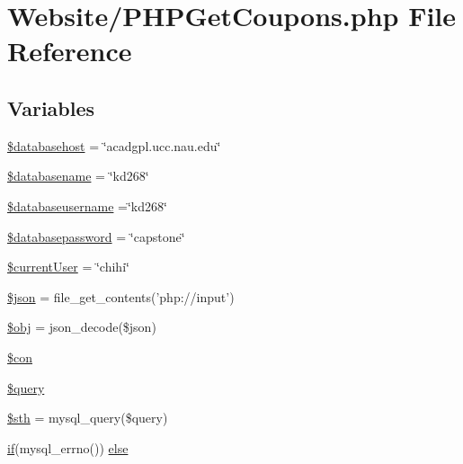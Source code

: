 \hypertarget{_p_h_p_get_coupons_8php}{\section{Website/\-P\-H\-P\-Get\-Coupons.php File Reference}
\label{_p_h_p_get_coupons_8php}
}
\subsection*{Variables}
\begin{DoxyCompactItemize}
\item 
\hyperlink{_p_h_p_get_coupons_8php_a034ead57b6864a4413371711e8d65372}{\$databasehost} = \char`\"{}acadgpl.\-ucc.\-nau.\-edu\char`\"{}
\item 
\hyperlink{_p_h_p_get_coupons_8php_aace53f8afce81b52040cef0cd850138a}{\$databasename} = \char`\"{}kd268\char`\"{}
\item 
\hyperlink{_p_h_p_get_coupons_8php_a251bf75f510d7c8b556c65d7c30e911f}{\$databaseusername} =\char`\"{}kd268\char`\"{}
\item 
\hyperlink{_p_h_p_get_coupons_8php_a1a07536b6a5f43f2d8f826bd2ee6c91a}{\$databasepassword} = \char`\"{}capstone\char`\"{}
\item 
\hyperlink{_p_h_p_get_coupons_8php_a478a2fc0252b087f8bc01921fef09b78}{\$current\-User} = \char`\"{}chihi\char`\"{}
\item 
\hyperlink{_p_h_p_get_coupons_8php_acedd13b51401130848ce18f4d5c52605}{\$json} = file\-\_\-get\-\_\-contents('php\-://input')
\item 
\hyperlink{_p_h_p_get_coupons_8php_a9008ed94ba185855b1723e367744b87e}{\$obj} = json\-\_\-decode(\$json)
\item 
\hyperlink{_p_h_p_get_coupons_8php_a0debe10448ec56a57b5509648408a549}{\$con}
\item 
\hyperlink{_p_h_p_get_coupons_8php_af59a5f7cd609e592c41dc3643efd3c98}{\$query}
\item 
\hyperlink{_p_h_p_get_coupons_8php_afa9126f9664959c02795be300a135f93}{\$sth} = mysql\-\_\-query(\$query)
\item 
\hyperlink{_m_c_mhome_page_8php_a8dec719c1645067d1065f7f064d4b967}{if}(mysql\-\_\-errno()) \hyperlink{_p_h_p_get_coupons_8php_acd5fe7f2086f786c96623b819503b734}{else}
\end{DoxyCompactItemize}


